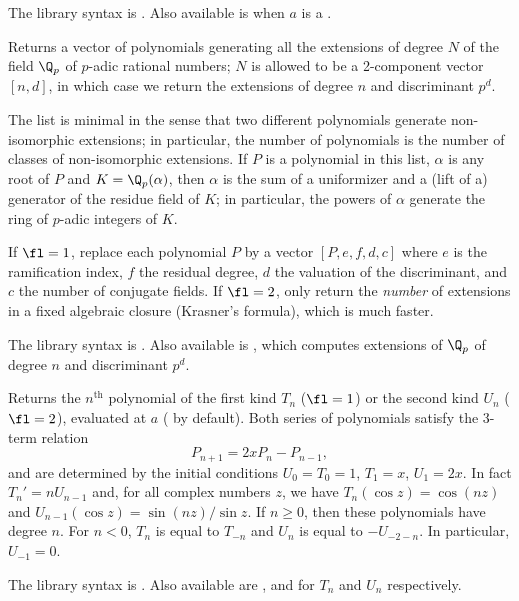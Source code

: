 The library syntax is .
Also available is  when $a$ is a
.

\label{se:padicfields}
Returns a vector of polynomials generating all the extensions of degree
$N$ of the field $\Q_p$ of $p$-adic rational numbers; $N$ is
allowed to be a 2-component vector $[n,d]$, in which case we return the
extensions of degree $n$ and discriminant $p^d$.

The list is minimal in the sense that two different polynomials generate
non-isomorphic extensions; in particular, the number of polynomials is the
number of classes of non-isomorphic extensions. If $P$ is a polynomial in this
list, $\alpha$ is any root of $P$ and $K = \Q_p(\alpha)$, then $\alpha$
is the sum of a uniformizer and a (lift of a) generator of the residue field
of $K$; in particular, the powers of $\alpha$ generate the ring of $p$-adic
integers of $K$.

If $\fl = 1$, replace each polynomial $P$ by a vector $[P, e, f, d, c]$
where $e$ is the ramification index, $f$ the residual degree, $d$ the
valuation of the discriminant, and $c$ the number of conjugate fields.
If $\fl = 2$, only return the \emph{number} of extensions in a fixed
algebraic closure (Krasner's formula), which is much faster.

The library syntax is .
Also available is
, which computes
extensions of $\Q_p$ of degree $n$ and discriminant $p^d$.

\label{se:polchebyshev}
Returns the $n^{\text{th}}$
 polynomial of the first kind $T_n$ ($\fl=1$) or the second
kind $U_n$ ($\fl=2$), evaluated at $a$ ( by default). Both series of
polynomials satisfy the 3-term relation
$$ P_{n+1} = 2xP_n - P_{n-1}, $$
and are determined by the initial conditions $U_0 = T_0 = 1$, $T_1 = x$,
$U_1 = 2x$. In fact $T_n' = n U_{n-1}$ and, for all complex numbers $z$, we
have $T_n(\cos z) = \cos (nz)$ and $U_{n-1}(\cos z) = \sin(nz)/\sin z$.
If $n \geq 0$, then these polynomials have degree $n$.  For $n < 0$,
$T_n$ is equal to $T_{-n}$ and $U_n$ is equal to $-U_{-2-n}$.
In particular, $U_{-1} = 0$.

The library syntax is .
Also available are
,
 and
 for $T_n$ and $U_n$ respectively.

